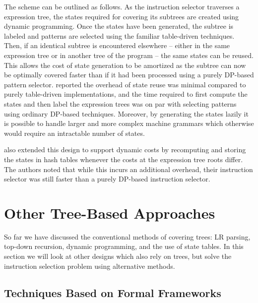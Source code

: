 {The scheme can be outlined as follows.
%
As the \gls{instruction selector}
traverses a \gls{expression tree}, the \glspl{state} required for covering its
\glspl{subtree} are created using dynamic programming.
%
Once the \glspl{state}
have been generated, the \gls{subtree} is labeled and \glspl{pattern} are
selected using the familiar table-driven techniques.
%
Then, if an identical
\gls{subtree} is encountered elsewhere -- either in the same \gls{expression tree}
or in another \gls{tree} of the \gls{program} -- the same \glspl{state} can be
reused.
%
This allows the cost of \gls{state} generation to be amortized as the
\gls{subtree} can now be optimally covered faster than if it had been processed
using a purely \gls{DP}-based \gls{pattern selector}.
%
\citeauthor{Ertl2006}
reported the overhead of \gls{state} reuse was minimal compared to purely
table-driven implementations, and the time required to first compute the
\glspl{state} and then label the \glspl{expression tree} was on par with selecting
\glspl{pattern} using ordinary \gls{DP}-based techniques.
%
Moreover, by
generating the \glspl{state} lazily it is possible to handle larger and more
complex \glspl{machine grammar} which otherwise would require an
intractable number of \glspl{state}.

\citeauthor{Ertl2006} also extended this design to support dynamic costs by
recomputing and storing the \glspl{state} in hash tables whenever the costs at
the \gls{expression tree} \glspl{root} differ.
%
The authors noted that while this
incurs an additional overhead, their \gls{instruction selector} was still faster
than a purely \gls{DP}-based \gls{instruction selector}.


\section{Other Tree-Based Approaches}

So far we have discussed the conventional methods of covering \glspl{tree}:
\gls{LR parsing}, top-down recursion, dynamic programming, and the use of
\gls{state} tables.
%
In this section we will look at other designs which also
rely on \glspl{tree}, but solve the \gls{instruction selection} problem using
alternative methods.


\subsection{Techniques Based on Formal Frameworks}

}
